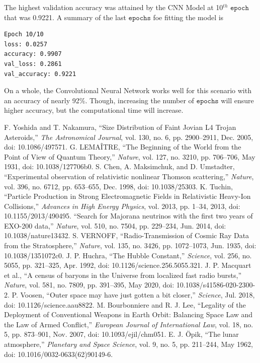 \documentclass[conference]{IEEEtran}
\begin{document}
The highest validation accuracy was attained by the CNN Model at 10$^{th}$ $\mathtt{epoch}$ that was 0.9221. A summary of the last $\mathtt{epochs}$ foe fitting the model is 
\begin{verbatim}
Epoch 10/10
loss: 0.0257
accuracy: 0.9907
val_loss: 0.2861
val_accuracy: 0.9221
\end{verbatim}
On a whole, the Convolutional Neural Network works well for this scenario with an accuracy of nearly 92\%. Though, increasing the number of $\mathtt{epochs}$ will ensure higher accuracy, but the computational time will increase.
\begin{thebibliography}{00}
 F. Yoshida and T. Nakamura, “Size Distribution of Faint Jovian L4 Trojan Asteroids,” \textit{The Astronomical Journal}, vol. 130, no. 6, pp. 2900–2911, Dec. 2005, doi: 10.1086/497571.
 G. LEMAÎTRE, “The Beginning of the World from the Point of View of Quantum Theory,” \textit{Nature}, vol. 127, no. 3210, pp. 706–706, May 1931, doi: 10.1038/127706b0.
 S. Chen, A. Maksimchuk, and D. Umstadter, “Experimental observation of relativistic nonlinear Thomson scattering,” \textit{Nature}, vol. 396, no. 6712, pp. 653–655, Dec. 1998, doi: 10.1038/25303.
 K. Tuchin, “Particle Production in Strong Electromagnetic Fields in Relativistic Heavy-Ion Collisions,” \textit{Advances in High Energy Physics}, vol. 2013, pp. 1–34, 2013, doi: 10.1155/2013/490495.
 “Search for Majorana neutrinos with the first two years of EXO-200 data,” \textit{Nature}, vol. 510, no. 7504, pp. 229–234, Jun. 2014, doi: 10.1038/nature13432.
 S. VERNOFF, “Radio-Transmission of Cosmic Ray Data from the Stratosphere,” \textit{Nature}, vol. 135, no. 3426, pp. 1072–1073, Jun. 1935, doi: 10.1038/1351072c0.
 J. P. Huchra, “The Hubble Constant,” \textit{Science}, vol. 256, no. 5055, pp. 321–325, Apr. 1992, doi: 10.1126/science.256.5055.321.
 J. P. Macquart et al., “A census of baryons in the Universe from localized fast radio bursts,” \textit{Nature}, vol. 581, no. 7809, pp. 391–395, May 2020, doi: 10.1038/s41586-020-2300-2.
 P. Voosen, “Outer space may have just gotten a bit closer,” \textit{Science}, Jul. 2018, doi: 10.1126/science.aau8822.
 M. Bourbonniere and R. J. Lee, “Legality of the Deployment of Conventional Weapons in Earth Orbit: Balancing Space Law and the Law of Armed Conflict,” \textit{European Journal of International Law}, vol. 18, no. 5, pp. 873–901, Nov. 2007, doi: 10.1093/ejil/chm051.
 E. J. Öpik, “The lunar atmosphere,” \textit{Planetary and Space Science}, vol. 9, no. 5, pp. 211–244, May 1962, doi: 10.1016/0032-0633(62)90149-6.

\end{thebibliography}
\end{document}
